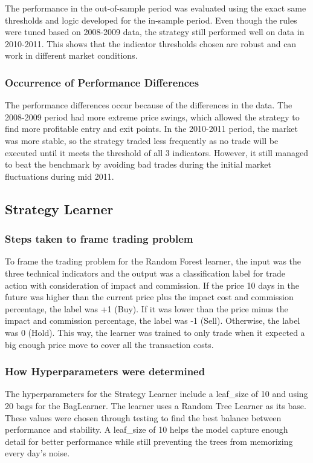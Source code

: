 \documentclass[
	letterpaper, %
]{jdf}
\begin{document}
The performance in the out-of-sample period was evaluated using the exact same thresholds and logic developed for the in-sample period. Even though the rules were tuned based on 2008-2009 data, the strategy still performed well on data in 2010-2011. This shows that the indicator thresholds chosen are robust and can work in different market conditions.

\subsubsection{Occurrence of Performance Differences}

The performance differences occur because of the differences in the data. The 2008-2009 period had more extreme price swings, which allowed the strategy to find more profitable entry and exit points. In the 2010-2011 period, the market was more stable, so the strategy traded less frequently as no trade will be executed until it meets the threshold of all 3 indicators. However, it still managed to beat the benchmark by avoiding bad trades during the initial market fluctuations during mid 2011.


\subsection{Strategy Learner}
\subsubsection{Steps taken to frame trading problem}

To frame the trading problem for the Random Forest learner, the input was the three technical indicators and the output was a classification label for trade action with consideration of impact and commission. If the price 10 days in the future was higher than the current price plus the impact cost and commission percentage, the label was +1 (Buy). If it was lower than the price minus the impact and commission percentage, the label was -1 (Sell). Otherwise, the label was 0 (Hold). This way, the learner was trained to only trade when it expected a big enough price move to cover all the transaction costs.

\subsubsection{How Hyperparameters were determined}

The hyperparameters for the Strategy Learner include a leaf\_size of 10 and using 20 bags for the BagLearner. The learner uses a Random Tree Learner as its base. These values were chosen through testing to find the best balance between performance and stability. A leaf\_size of 10 helps the model capture enough detail for better performance while still preventing the trees from memorizing every day's noise.
\end{document}
